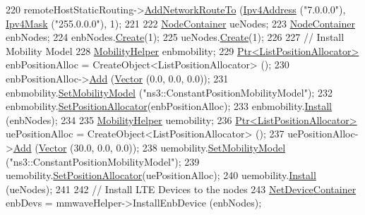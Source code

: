 \begin{DoxyCode}
220         remoteHostStaticRouting->\hyperlink{classns3_1_1Ipv4StaticRouting_a8bf5eaa7ba49fe33c78c70d5560b6c39}{AddNetworkRouteTo} (\hyperlink{classns3_1_1Ipv4Address}{Ipv4Address} (\textcolor{stringliteral}{"7.0.0.0"}), 
      \hyperlink{classns3_1_1Ipv4Mask}{Ipv4Mask} (\textcolor{stringliteral}{"255.0.0.0"}), 1);
221 
222         \hyperlink{classns3_1_1NodeContainer}{NodeContainer} ueNodes;
223         \hyperlink{classns3_1_1NodeContainer}{NodeContainer} enbNodes;
224         enbNodes.\hyperlink{classns3_1_1NodeContainer_a787f059e2813e8b951cc6914d11dfe69}{Create}(1);
225         ueNodes.\hyperlink{classns3_1_1NodeContainer_a787f059e2813e8b951cc6914d11dfe69}{Create}(1);
226 
227         \textcolor{comment}{// Install Mobility Model}
228         \hyperlink{classns3_1_1MobilityHelper}{MobilityHelper} enbmobility;
229         \hyperlink{classns3_1_1Ptr}{Ptr<ListPositionAllocator>} enbPositionAlloc = 
      CreateObject<ListPositionAllocator> ();
230         enbPositionAlloc->\hyperlink{classns3_1_1ListPositionAllocator_a460e82f015ac012a73ba0ea0cccb3486}{Add} (\hyperlink{classns3_1_1Vector3D_a7e59b47bc94c9cb1dadff68c1d0112d8}{Vector} (0.0, 0.0, 0.0));
231         enbmobility.\hyperlink{classns3_1_1MobilityHelper_a030275011b6f40682e70534d30280aba}{SetMobilityModel} (\textcolor{stringliteral}{"ns3::ConstantPositionMobilityModel"});
232         enbmobility.\hyperlink{classns3_1_1MobilityHelper_ac59d5295076be3cc11021566713a28c5}{SetPositionAllocator}(enbPositionAlloc);
233         enbmobility.\hyperlink{classns3_1_1MobilityHelper_a07737960ee95c0777109cf2994dd97ae}{Install} (enbNodes);
234 
235         \hyperlink{classns3_1_1MobilityHelper}{MobilityHelper} uemobility;
236         \hyperlink{classns3_1_1Ptr}{Ptr<ListPositionAllocator>} uePositionAlloc = 
      CreateObject<ListPositionAllocator> ();
237         uePositionAlloc->\hyperlink{classns3_1_1ListPositionAllocator_a460e82f015ac012a73ba0ea0cccb3486}{Add} (\hyperlink{classns3_1_1Vector3D_a7e59b47bc94c9cb1dadff68c1d0112d8}{Vector} (30.0, 0.0, 0.0));
238         uemobility.\hyperlink{classns3_1_1MobilityHelper_a030275011b6f40682e70534d30280aba}{SetMobilityModel} (\textcolor{stringliteral}{"ns3::ConstantPositionMobilityModel"});
239         uemobility.\hyperlink{classns3_1_1MobilityHelper_ac59d5295076be3cc11021566713a28c5}{SetPositionAllocator}(uePositionAlloc);
240         uemobility.\hyperlink{classns3_1_1MobilityHelper_a07737960ee95c0777109cf2994dd97ae}{Install} (ueNodes);
241 
242         \textcolor{comment}{// Install LTE Devices to the nodes}
243         \hyperlink{classns3_1_1NetDeviceContainer}{NetDeviceContainer} enbDevs = mmwaveHelper->InstallEnbDevice (enbNodes);

\end{DoxyCode}
